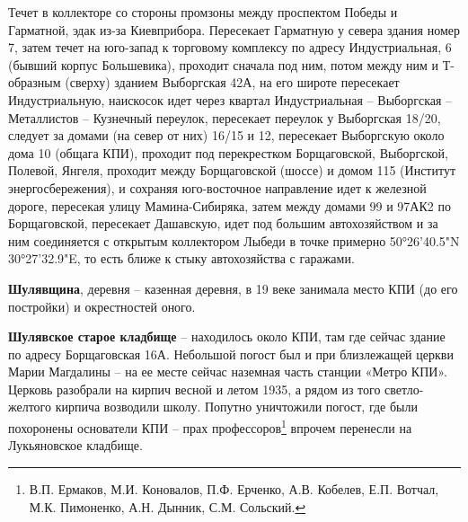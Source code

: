 Течет в коллекторе со стороны промзоны между проспектом Победы и Гарматной, эдак из-за Киевприбора. Пересекает Гарматную у севера здания номер 7, затем течет на юго-запад к торговому комплексу по адресу Индустриальная, 6 (бывший корпус Большевика), проходит сначала под ним, потом между ним и Т-образным (сверху) зданием Выборгская 42А, на его широте пересекает Индус\-триальную, наискосок идет через квартал Ин\-дустриальная – Выборгская – Металлистов – Кузнечный переулок, пересекает переулок у Выборгская 18/20, следует за домами (на север от них) 16/15 и 12, пересекает Выборгскую около дома 10 (общага КПИ), проходит под перекрестком Борщаговской, Выборгской, Полевой, Янгеля, проходит между Борщаговской (шоссе) и домом 115 (Институт энергосбережения), и сохраняя юго-восточное направление идет к железной дороге, пересекая улицу Мамина-Сибиряка, затем между домами 99 и 97АК2 по Борщаговской, пересекает Дашавскую, идет под большим автохозяйством и за ним соединяется с открытым коллектором Лыбеди в точке примерно 50°26'40.5"N 30°27'32.9"E, то есть ближе к стыку автохозяйства с гаражами.\\


\medskip

\textbf{Шулявщина}, деревня – казенная деревня, в 19 веке занимала место КПИ (до его постройки) и окрестностей оного.\\

\medskip


\textbf{Шулявское старое кладбище} – находилось около КПИ, там где сейчас здание по адресу Борщаговская 16А. Небольшой погост был и при близлежащей церкви Марии Магдалины – на ее месте сейчас наземная часть станции «Метро КПИ». Церковь разобрали на кирпич весной и летом 1935, а рядом из того светло-желтого кирпича возводили школу. Попутно уничтожили погост, где были похоронены основатели КПИ – прах профессоров\footnote{В.П. Ермаков, М.И. Коновалов, П.Ф. Ерченко, А.В. Кобелев, Е.П. Вотчал, М.К. Пимоненко, А.Н. Дынник, С.М. Сольский.} впрочем перенесли на Лукьяновское кладбище.



